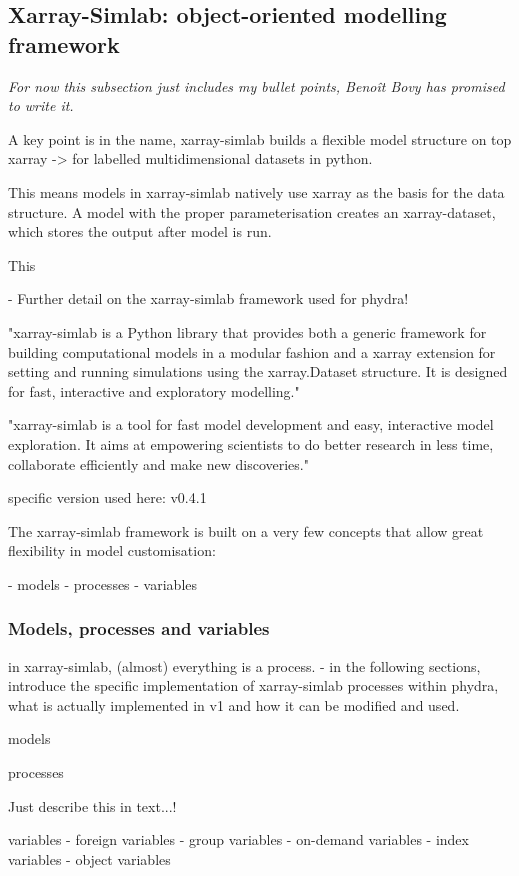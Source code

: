 \documentclass[template.tex]{subfiles}
\begin{document}
\subsection{Xarray-Simlab: object-oriented modelling framework}
\textit{For now this subsection just includes my bullet points, Benoît Bovy has promised to write it.}

A key point is in the name, xarray-simlab builds a flexible model structure on top xarray -> for labelled multidimensional datasets in python.

This means models in xarray-simlab natively use xarray as the basis for the data structure. A model with the proper parameterisation creates an xarray-dataset, which stores the output after model is run.

This 

- Further detail on the xarray-simlab framework used for phydra!

"xarray-simlab is a Python library that provides both a generic framework for building computational models in a modular fashion and a xarray extension for setting and running simulations using the xarray.Dataset structure. It is designed for fast, interactive and exploratory modelling."

"xarray-simlab is a tool for fast model development and easy, interactive model exploration. It aims at empowering scientists to do better research in less time, collaborate efficiently and make new discoveries."

specific version used here: v0.4.1 \cite{benoit_bovy_2020_3755979}


The xarray-simlab framework is built on a very few concepts that allow great flexibility in model customisation:

- models
- processes
- variables

\subsubsection{Models, processes and variables}
in xarray-simlab, (almost) everything is a process.
- in the following sections, introduce the specific implementation of xarray-simlab processes within phydra, what is actually implemented in v1 and how it can be modified and used.

models

processes

Just describe this in text...!

variables
- foreign variables
- group variables
- on-demand variables
- index variables
- object variables
\end{document}
